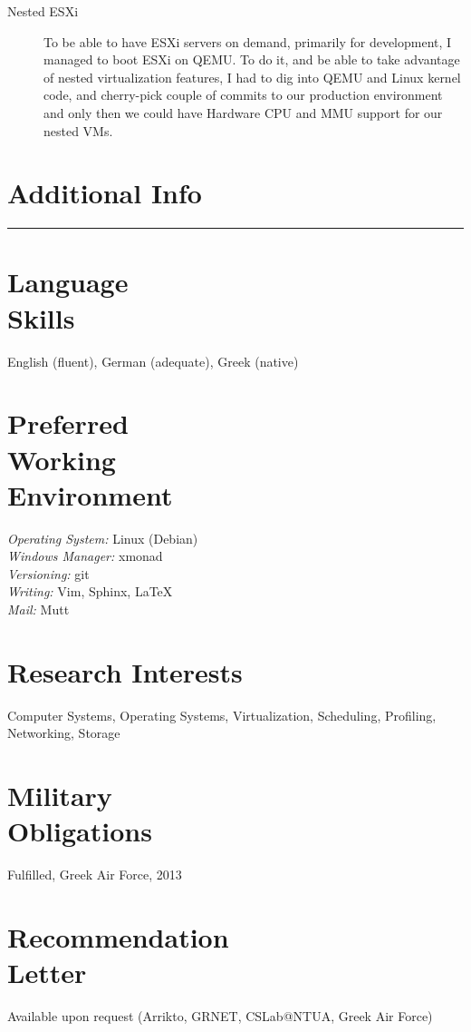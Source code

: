 \documentclass[margin,centered]{res}
\begin{document}
\begin{resume}
\begin{description}
\item[Nested ESXi]
To be able to have ESXi servers on demand, primarily for development, I managed
to boot ESXi on QEMU. To do it, and be able to take advantage of nested
virtualization features, I had to dig into QEMU and Linux kernel code, and
cherry-pick couple of commits to our production environment and only then we
could have Hardware CPU and MMU support for our nested VMs.
\end{description}

\pagebreak
\section{Additional Info}
\rule[3pt]{\textwidth}{0.4pt}

\section{\sc Language\\Skills}
English (fluent), German (adequate), Greek (native)

\section{\sc Preferred\\Working\\Environment}
\textit{Operating System:} Linux (Debian)\\
\textit{Windows Manager:} xmonad\\
\textit{Versioning:} git\\
\textit{Writing:} Vim, Sphinx, \LaTeX\\
\textit{Mail:} Mutt

\section{\sc Research Interests}
Computer Systems, Operating Systems, Virtualization, Scheduling, Profiling, Networking, Storage

\section{\sc Military\\Obligations}
Fulfilled, Greek Air Force, 2013

\section{\sc Recommendation\\Letter}
Available upon request (Arrikto, GRNET, CSLab@NTUA, Greek Air Force)

\end{resume}

\def\enoteheading{\section{Notes}\rule[0pt]{\textwidth}{0.4pt}}
\parskip=2pt
\theendnotes
\end{document}
